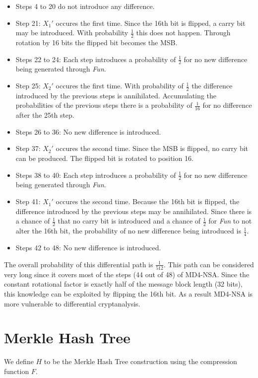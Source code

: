 \begin{itemize}
\item Steps 4 to 20 do not introduce any difference.
\item Step 21: $X_1'$ occures the first time. Since the 16th bit is flipped, a carry bit may be introduced. With probability $\frac{1}{2}$ this does not happen. Through rotation by 16 bits the flipped bit becomes the MSB.
\item Steps 22 to 24: Each step introduces a probability of $\frac{1}{2}$ for no new difference being generated through \textit{Fun}.
\item Step 25: $X_2'$ occures the first time. With probability of $\frac{1}{2}$ the difference introduced by the previous steps is annihilated. Accumulating the probabilities of the previous steps there is a probability of $\frac{1}{16}$ for no difference after the 25th step.
\item Steps 26 to 36: No new difference is introduced.
\item Step 37: $X_2'$ occures the second time. Since the MSB is flipped, no carry bit can be produced. The flipped bit is rotated to position 16.
\item Steps 38 to 40: Each step introduces a probability of $\frac{1}{2}$ for no new difference being generated through \textit{Fun}.
\item Step 41: $X_1'$ occures the second time. Because the 16th bit is flipped, the difference introduced by the previous steps may be annihilated. Since there is a chance of $\frac{1}{2}$ that no carry bit is introduced and a chance of $\frac{1}{2}$ for \textit{Fun} to not alter the 16th bit, the probability of no new difference being introduced is $\frac{1}{4}$.
\item Steps 42 to 48: No new difference is introduced.

\end{itemize}

The overall probability of this differential path is $\frac{1}{512}$. This path can be considered very long since it covers most of the steps (44 out of 48) of MD4-NSA. Since the constant rotational factor is exactly half of the message block length (32 bits), this knowledge can be exploited by flipping the 16th bit. As a result MD4-NSA is more vulnerable to differential cryptanalysis.

\section{Merkle Hash Tree}
We define $H$ to be the Merkle Hash Tree construction using the compression function $F$.

